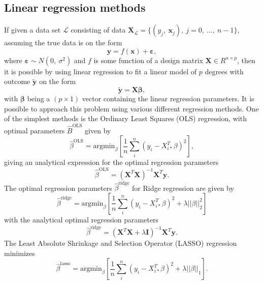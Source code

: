 \documentclass[a4paper, 10pt]{article}
\begin{document}
\begin{multicols}{2}
\subsection{Linear regression methods}
If given a data set $\mathcal{L}$ consisting of data $\bm{X}_\mathcal{L} = \{(y_j,\ \bm{x}_j),\ j=0,\ \dots,\ n-1\}$, assuming the true data is on the form
\[
\bm{y} = f(\bm{x})+ \bm{\varepsilon} ,
\]
where $\bm{\varepsilon} \sim N(0,\ \sigma ^2)$ and $f$ is some function of a design matrix $\bm{X}\in R^{n\times p}$, then it is possible by using linear regression to fit a linear model of $p$ degrees with outcome $\bm{\tilde{y}}$ on the form
\[
\bm{\tilde{y}} = \bm{X}\bm{\beta},
\]
with $\bm{\beta}$ being a $(p\times 1)$ vector containing the linear regression parameters.
It is possible to approach this problem using various different regression methods. One of the simplest methods is the Ordinary Least Squares (OLS) regression, with optimal  parameters $\hat{B}^\text{OLS}$ given by
\begin{equation}
    \hat{\beta}^\text{OLS} = \text{argmin}_{ {\beta} } \left[ \frac{1}{n} \sum_i^n (y_i - X_{i*}^T \beta)^2 \right],
    \label{eq:argminbeta_OLS}
\end{equation}
giving an analytical expression for the optimal regression parameters
\begin{equation}
    \hat{\beta}^{\text{OLS}} = (\bm{X}^T\bm{X})^{-1} \bm{X}^T \bm{y}.
    \label{eq:beta_OLS}
\end{equation}
The optimal regression parameters $\hat{\beta}^\text{ridge}$ for Ridge regression are given by
\begin{equation}
    \hat{\beta}^\text{ridge} = \text{argmin}_\beta \left[ \frac{1}{n}\sum_i^n(y_i-X_{i*}^T\beta)^2 + \lambda ||\beta||_2^2  \right]
    \label{eq:argminbeta_ridge}
\end{equation}
with the analytical optimal regression parameters
\begin{equation}
    \hat{\beta}^\text{ridge} = (\bm{X}^T\bm{X} +\lambda \bm{I})^{-1} \bm{X}^T \bm{y}.
    \label{eq:beta_ridge}
\end{equation}
The Least Absolute Shrinkage and Selection Operator (LASSO) regression minimizes
\begin{equation}
    \hat{\beta}^\text{lasso} =  \text{argmin}_\beta \left[  \frac{1}{n}\sum_i^n(y_i-X_{i*}^T\beta)^2 + \lambda ||\beta||_1  \right].
    \label{eq:argminbeta_lasso}
\end{equation}


\end{multicols}
\end{document}
